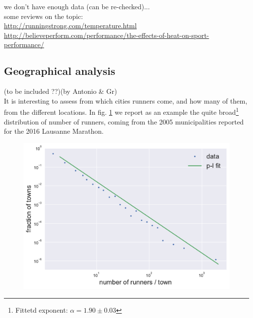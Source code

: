 \documentclass[fleqn,10pt]{wlscirep}
\begin{document}
			we don't have enough data (can be re-checked)...\\
			
			some reviews on the topic:\\
			\url{http://runningstrong.com/temperature.html}\\
			\url{http://believeperform.com/performance/the-effects-of-heat-on-sport-performance/}
			
	
	
		\subsection*{Geographical analysis}
	
			(to be included ??)(by Antonio \& Gr) \\			
			
			It is interesting to assess from which cities runners come, and how many of them, from the different locations. 
			In fig. \ref{origin_towns_dist} we report as an example the quite 
			broad\footnote{Fittetd exponent: $ \alpha = 1.90 \pm 0.03 $} distribution of number of runners, coming from the 2005 municipalities reported for the 2016 Lausanne Marathon.
			
			\begin{figure}[h]	
				
				\centering
				
				\includegraphics[scale=0.6]{../data_analysis/plots_for_paper/origin_towns_dist.pdf}
				
				\caption{}
				
				\label{origin_towns_dist}
				
			\end{figure}								
	
\end{document}
